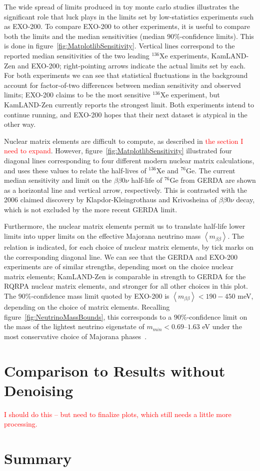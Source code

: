 The wide spread of limits produced in toy monte carlo studies illustrates the significant role that luck plays in the limits set by low-statistics experiments such as EXO-200.  To compare EXO-200 to other experiments, it is useful to compare both the limits and the median sensitivities (median $90\%$-confidence limits).  This is done in figure~\ref{fig:MatplotlibSensitivity}.  Vertical lines correspond to the reported median sensitivities of the two leading $^{136}$Xe experiments, KamLAND-Zen and EXO-200; right-pointing arrows indicate the actual limits set by each.  For both experiments we can see that statistical fluctuations in the background account for factor-of-two differences between median sensitivity and observed limits; EXO-200 claims to be the most sensitive $^{136}$Xe experiment, but KamLAND-Zen currently reports the strongest limit.  Both experiments intend to continue running, and EXO-200 hopes that their next dataset is atypical in the other way.

Nuclear matrix elements are difficult to compute, as described in \textcolor{red}{the section I need to expand}.  However, figure~\ref{fig:MatplotlibSensitivity} illustrated four diagonal lines corresponding to four different modern nuclear matrix calculations, and uses these values to relate the half-lives of $^{136}$Xe and $^{76}$Ge.  The current median sensitivity and limit on the $\beta\beta 0\nu$ half-life of $^{76}$Ge from GERDA are shown as a horizontal line and vertical arrow, respectively.  This is contrasted with the 2006 claimed discovery by Klapdor-Kleingrothaus and Krivosheina of $\beta\beta 0\nu$ decay, which is not excluded by the more recent GERDA limit.

Furthermore, the nuclear matrix elements permit us to translate half-life lower limits into upper limits on the effective Majorana neutrino mass $\left<m_{\beta\beta}\right>$.  The relation is indicated, for each choice of nuclear matrix elements, by tick marks on the corresponding diagonal line.  We can see that the GERDA and EXO-200 experiments are of similar strengths, depending most on the choice nuclear matrix elements; KamLAND-Zen is comparable in strength to GERDA for the RQRPA nuclear matrix elements, and stronger for all other choices in this plot.  The $90\%$-confidence mass limit quoted by EXO-200 is $\left<m_{\beta\beta}\right> < 190-450$ meV, depending on the choice of matrix elements.  Recalling figure~\ref{fig:NeutrinoMassBounds}, this corresponds to a $90\%$-confidence limit on the mass of the lightest neutrino eigenstate of $m_{min} < 0.69–1.63$ eV under the most conservative choice of Majorana phases~\cite{NewEXObb0nPaper_2014}.

\section{Comparison to Results without Denoising}\label{sec:ResultComparison}

\textcolor{red}{I should do this -- but need to finalize plots, which still needs a little more processing.}

\section{Summary}\label{sec:ResultSummary}
